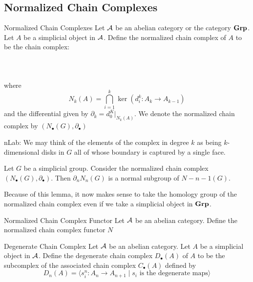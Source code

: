 \documentclass[a4paper]{article}
\begin{document}
\subsection{Normalized Chain Complexes}
\begin{defn}{Normalized Chain Complexes}{} Let $\mathcal{A}$ be an abelian category or the category $\bold{Grp}$. Let $A$ be a simplicial object in $\mathcal{A}$. Define the normalized chain complex of $A$ to be the chain complex: \\~\\
\\~\\
where $$N_k(A)=\bigcap_{i=1}^k\ker(d_i^k:A_k\to A_{k-1})$$ and the differential given by $\partial_k=d_0^K|_{N_k(A)}$. We denote the normalized chain complex by $(N_\bullet(G),\partial_\bullet)$
\end{defn}

nLab: We may think of the elements of the complex in degree $k$ as being $k$-dimensional disks in $G$ all of whose boundary is captured by a single face. 

\begin{lmm}{}{} Let $G$ be a simplicial group. Consider the normalized chain complex $(N_\bullet(G),\partial_\bullet)$. Then $\partial_n N_n(G)$ is a normal subgroup of $N-{n-1}(G)$. 
\end{lmm}

Because of this lemma, it now makes sense to take the homology group of the normalized chain complex even if we take a simplicial object in $\bold{Grp}$. 

\begin{defn}{Normalized Chain Complex Functor}{} Let $\mathcal{A}$ be an abelian category. Define the normalized chain complex functor $N$
\end{defn}

\begin{defn}{Degenerate Chain Complex}{} Let $\mathcal{A}$ be an abelian category. Let $A$ be a simplicial object in $\mathcal{A}$. Define the degenerate chain complex $D_\bullet(A)$ of $A$ to be the subcomplex of the associated chain complex $C_\bullet(A)$ defined by $$D_n(A)=\langle s_i^n:A_n\to A_{n+1}\;|\;s_i\text{ is the degenerate maps}\rangle$$
\end{defn}
\end{document}
